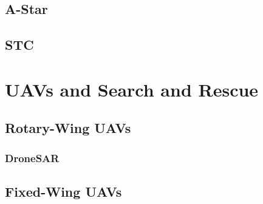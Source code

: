 \subsection{A-Star}
\subsection{STC}

\section{UAVs and Search and Rescue}
\subsection{Rotary-Wing UAVs}
\subsubsection{DroneSAR}
\subsection{Fixed-Wing UAVs}


